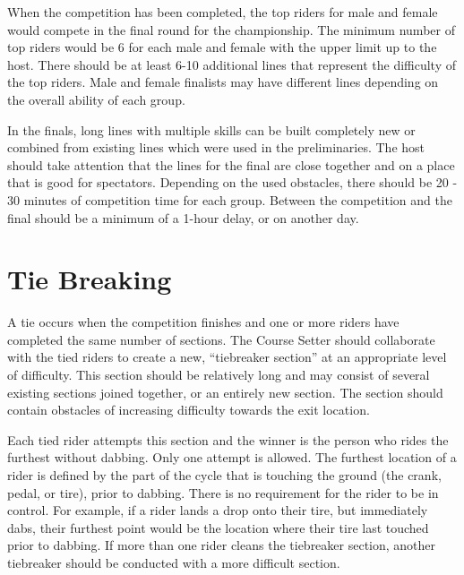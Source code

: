 When the competition has been completed, the top riders for male and female would compete in the final round for the championship.
The minimum number of top riders would be 6 for each male and female with the upper limit up to the host.
There should be at least 6-10 additional lines that represent the difficulty of the top riders.
Male and female finalists may have different lines depending on the overall ability of each group.

In the finals, long lines with multiple skills can be built completely new or combined from existing lines which were used in the preliminaries.
The host should take attention that the lines for the final are close together and on a place that is good for spectators.
Depending on the used obstacles, there should be 20 - 30 minutes of competition time for each group.
Between the competition and the final should be a minimum of a 1-hour delay, or on another day.

\section{Tie Breaking}
A tie occurs when the competition finishes and one or more riders have completed the same number of sections.
The Course Setter should collaborate with the tied riders to create a new, ``tiebreaker section'' at an appropriate level of difficulty.
This section should be relatively long and may consist of several existing sections joined together, or an entirely new section.
The section should contain obstacles of increasing difficulty towards the exit location.

Each tied rider attempts this section and the winner is the person who rides the furthest without dabbing.
Only one attempt is allowed.
The furthest location of a rider is defined by the part of the cycle that is touching the ground (the crank, pedal, or tire), prior to dabbing.
There is no requirement for the rider to be in control.
For example, if a rider lands a drop onto their tire, but immediately dabs, their furthest point would be the location where their tire last touched prior to dabbing.
If more than one rider cleans the tiebreaker section, another tiebreaker should be conducted with a more difficult section.
